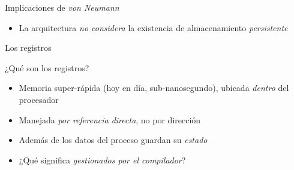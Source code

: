 \documentclass[presentation]{beamer}
\newcommand{\rarrow}{$\rightarrow$\hskip 0.5em}
\begin{document}
\begin{frame}[label={sec:org4f48b5a}]{Implicaciones de \emph{von Neumann}}
\begin{itemize}
\item La arquitectura \emph{no considera} la existencia de almacenamiento \emph{persistente}
\end{itemize}
\end{frame}

\begin{frame}[label={sec:org5c079a9}]{Los registros}
\begin{center}
¿Qué son los registros?
\end{center}
\begin{itemize}
\item Memoria super-rápida (hoy en día, sub-nanosegundo), ubicada \emph{dentro}
del procesador
\item Manejada \emph{por referencia directa}, no por dirección
\item Además de los datos del proceso guardan su \emph{estado}
\item ¿Qué significa \emph{gestionados por el compilador}?
\end{itemize}
\end{frame}
\end{document}
